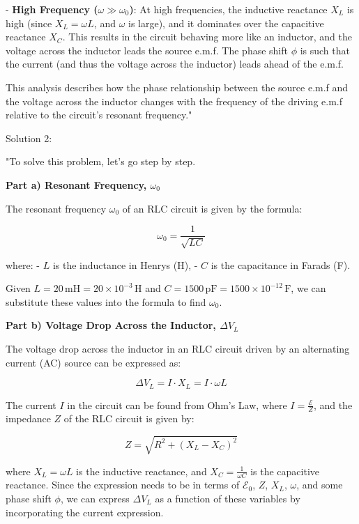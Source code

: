 - \textbf{High Frequency (\(\omega \gg \omega_{0}\))}: At high frequencies, the inductive reactance \(X_{L}\) is high (since \(X_{L} = \omega L\), and \(\omega\) is large), and it dominates over the capacitive reactance \(X_{C}\). This results in the circuit behaving more like an inductor, and the voltage across the inductor leads the source e.m.f. The phase shift \(\phi\) is such that the current (and thus the voltage across the inductor) leads ahead of the e.m.f.

This analysis describes how the phase relationship between the source e.m.f and the voltage across the inductor changes with the frequency of the driving e.m.f relative to the circuit's resonant frequency."

Solution 2:

"To solve this problem, let's go step by step.

\textbf{Part a) Resonant Frequency, \( \omega_{0} \)}

The resonant frequency \(\omega_{0}\) of an RLC circuit is given by the formula:

\[
\omega_{0} = \frac{1}{\sqrt{LC}}
\]

where:
- \(L\) is the inductance in Henrys (H),
- \(C\) is the capacitance in Farads (F).

Given \(L = 20 \, \text{mH} = 20 \times 10^{-3} \, \text{H}\) and \(C = 1500 \, \text{pF} = 1500 \times 10^{-12} \, \text{F}\), we can substitute these values into the formula to find \(\omega_{0}\).

\textbf{Part b) Voltage Drop Across the Inductor, \( \Delta V_{L} \)}

The voltage drop across the inductor in an RLC circuit driven by an alternating current (AC) source can be expressed as:

\[
\Delta V_{L} = I \cdot X_{L} = I \cdot \omega L
\]

The current \(I\) in the circuit can be found from Ohm's Law, where \(I = \frac{\mathcal{E}}{Z}\), and the impedance \(Z\) of the RLC circuit is given by:

\[
Z = \sqrt{R^2 + (X_{L} - X_{C})^2}
\]

where \(X_{L} = \omega L\) is the inductive reactance, and \(X_{C} = \frac{1}{\omega C}\) is the capacitive reactance. Since the expression needs to be in terms of \(\mathcal{E}_{0}\), \(Z\), \(X_{L}\), \(\omega\), and some phase shift \(\phi\), we can express \(\Delta V_{L}\) as a function of these variables by incorporating the current expression.

